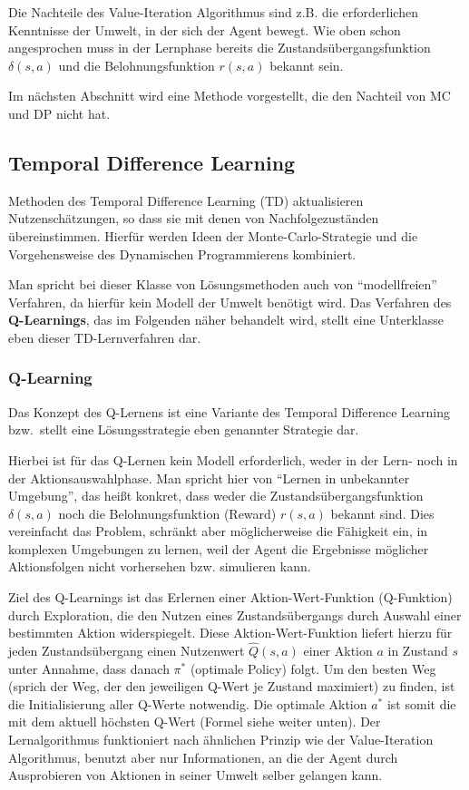 Die Nachteile des Value-Iteration Algorithmus sind z.B. die erforderlichen 
Kenntnisse der Umwelt, in der sich der Agent bewegt. Wie oben schon 
angesprochen muss in der Lernphase bereits die Zustandsübergangsfunktion 
$\delta(s,a)$ und die Belohnungsfunktion $r(s,a)$ bekannt sein.

Im nächsten Abschnitt wird eine Methode vorgestellt, die den Nachteil von MC 
und DP nicht hat.

\subsection{Temporal Difference Learning}
Methoden des Temporal Difference Learning (TD) aktualisieren Nutzenschätzungen, 
so dass sie mit denen von Nachfolgezuständen übereinstimmen. Hierfür werden 
Ideen der Monte-Carlo-Strategie und die Vorgehensweise des Dynamischen 
Programmierens kombiniert.

\par Man spricht bei dieser Klasse von Lösungsmethoden auch von 
"`modellfreien"' Verfahren, da hierfür kein Modell der Umwelt benötigt wird. 
Das Verfahren des \textbf{Q-Learnings}, das im Folgenden näher behandelt wird, stellt 
eine Unterklasse eben dieser TD-\-Lern\-ver\-fah\-ren dar.

\subsubsection{Q-Learning}
Das Konzept des Q-Lernens ist eine Variante des Temporal Difference Learning 
bzw.\ stellt eine Lösungsstrategie eben genannter Strategie dar.
\par Hierbei ist für das Q-Lernen kein Modell erforderlich, weder in der Lern- 
noch in der Aktionsauswahlphase. Man spricht hier von "`Lernen in unbekannter 
Umgebung"', das heißt konkret, dass weder die Zustandsübergangsfunktion 
$\delta(s,a)$ noch die Belohnungsfunktion (Reward) $r(s,a)$ bekannt sind.
Dies vereinfacht das Problem, schränkt aber möglicherweise die Fähigkeit ein, 
in komplexen Umgebungen zu lernen, weil der Agent die Ergebnisse möglicher 
Aktionsfolgen nicht vorhersehen bzw. simulieren kann.
\par Ziel des Q-Learnings ist das Erlernen einer Aktion-Wert-Funktion 
(Q-Funktion) durch Exploration, die den Nutzen eines Zustandsübergangs durch 
Auswahl einer bestimmten Aktion widerspiegelt.
Diese Aktion-Wert-Funktion liefert hierzu für jeden Zustandsübergang einen 
Nutzenwert $\hat{Q}(s,a)$ einer Aktion $a$ in Zustand $s$ unter Annahme, dass 
danach $\pi^*$ (optimale Policy) folgt. Um den besten Weg (sprich der Weg, der 
den jeweiligen Q-Wert je Zustand maximiert) zu finden, ist die Initialisierung 
aller Q-Werte notwendig. Die optimale Aktion $a^*$ ist somit die mit dem 
aktuell höchsten Q-Wert (Formel siehe weiter unten). Der Lernalgorithmus 
funktioniert nach ähnlichen Prinzip wie der Value-Iteration Algorithmus, 
benutzt aber nur Informationen, an die der Agent durch Ausprobieren von 
Aktionen in seiner Umwelt selber gelangen kann.

